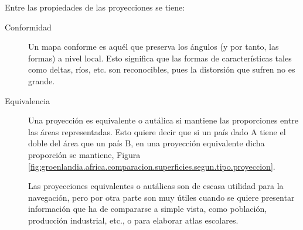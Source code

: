 Entre las propiedades de las proyecciones se tiene:

\begin{description}
\item[Conformidad] Un mapa conforme es aquél que preserva los ángulos (y por tanto, las formas) a nivel local. Esto significa que las formas de características tales como deltas, ríos, etc. son reconocibles, pues la distorsión que sufren no es grande.
\item[Equivalencia] Una proyección es equivalente o autálica si mantiene las proporciones entre las áreas representadas. Esto quiere decir que si un país dado A tiene el doble del área que un país B, en una proyección equivalente dicha proporción se mantiene, Figura \ref{fig:groenlandia.africa.comparacion.superficies.segun.tipo.proyeccion}. 

Las proyecciones equivalentes o autálicas son de escasa utilidad para la navegación, pero por otra parte son muy útiles cuando se quiere presentar información que ha de compararse a simple vista, como población, producción industrial, etc., o para elaborar atlas escolares.



\end{description}
